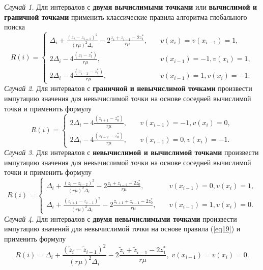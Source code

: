 \documentclass[10pt,a4paper]{book}
\begin{document}
\begin{enumerate}[itemsep=0pt,parsep=2pt,topsep=2pt,partopsep=0pt]
        \textit{Случай 1.} Для интервалов с \textbf{двумя вычислимыми точками} или \textbf{вычислимой и граничной точками} применить классические правила алгоритма глобального поиска
\begin{equation}\label{eq21} 
R(i)=
  \begin{cases}
     \Delta _i+\frac {{(z_i-z_{i-1})}^2}{{(r \mu)}^2 \Delta _i} - 2 \frac {z_i+z_{i-1}-2z_1^*}{r \mu}, & {\quad  v(x_i)=v(x_{i-1})=1,}\\
    2 \Delta _i-4 \frac {(z_i-z_1^*)}{r \mu}, & {\quad  v(x_{i-1})=-1, v(x_i)=1,}\\
    2 \Delta _i-4 \frac {(z_{i-1}-z_1^*)}{r \mu}, & {\quad  v(x_{i-1})=1, v(x_i)=-1.}
  \end{cases}
\end{equation}
        \textit{Случай 2.} Для интервалов с \textbf{граничной и невычислимой точками} произвести импутацию значения для невычислимой точки на основе соседней вычислимой точки и применить формулу
\begin{equation}\label{eq22} 
R(i)=
  \begin{cases}
    2 \Delta _i-4 \frac {(z_{i+1}-z_0^*)}{r \mu}, & {\quad  v(x_{i-1})=-1, v(x_i)=0,}\\
    2 \Delta _i-4 \frac {(z_{i-2}-z_0^*)}{r \mu}, & {\quad  v(x_{i-1})=0, v(x_i)=-1.}
  \end{cases}
\end{equation}
        \textit{Случай 3.} Для интервалов с \textbf{невычислимой и вычислимой точками} произвести импутацию значения для невычислимой точки на основе соседней вычислимой точки и применить формулу
\begin{equation}\label{eq23} 
R(i)=
  \begin{cases}
     \Delta _i+\frac {{(z_i-z_{i-2})}^2}{{(r \mu)}^2 \Delta _i} - 2 \frac {z_i+z_{i-2}-2z_0^*}{r \mu}, & {\quad  v(x_{i-1})=0, v(x_i)=1,}\\
     \Delta _i+\frac {{(z_{i+1}-z_{i-1})}^2}{{(r \mu)}^2 \Delta _i} - 2 \frac {z_{i+1}+z_{i-1}-2z_0^*}{r \mu}, & {\quad  v(x_{i-1})=1, v(x_i)=0.}
  \end{cases}
\end{equation}
        \textit{Случай 4.} Для интервалов с \textbf{двумя невычислимыми точками} произвести импутацию значений для невычислимой точки на основе правила (\ref{eq19}) и применить формулу
\begin{equation}\label{eq24} 
R(i)=\Delta _i+\frac {{(\tilde{z}_i-\tilde{z}_{i-1})}^2}{{(r \mu)}^2 \Delta _i} - 2 \frac {\tilde{z}_i+\tilde{z}_{i-1}-2z_1^*}{r \mu}, \; v(x_{i-1})=v(x_i)=0.

\end{equation}
\end{enumerate}
\end{document}

